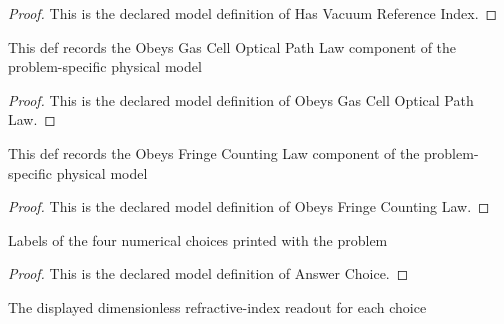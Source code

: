 \begin{proof}
  This is the declared model definition of Has Vacuum Reference Index.
\end{proof}
\begin{definition}
  \label{def:physics:phyx-mini-0152:phyxminiproblems-problemphyxmini0152-obeysgascellopticalpathlaw}
  This def records the Obeys Gas Cell Optical Path Law component of the problem-specific physical model
\end{definition}
\begin{proof}
  This is the declared model definition of Obeys Gas Cell Optical Path Law.
\end{proof}
\begin{definition}
  \label{def:physics:phyx-mini-0152:phyxminiproblems-problemphyxmini0152-obeysfringecountinglaw}
  This def records the Obeys Fringe Counting Law component of the problem-specific physical model
\end{definition}
\begin{proof}
  This is the declared model definition of Obeys Fringe Counting Law.
\end{proof}
\begin{definition}
  \label{def:physics:phyx-mini-0152:phyxminiproblems-problemphyxmini0152-answerchoice}
  Labels of the four numerical choices printed with the problem
\end{definition}
\begin{proof}
  This is the declared model definition of Answer Choice.
\end{proof}
\begin{definition}
  \label{def:physics:phyx-mini-0152:phyxminiproblems-problemphyxmini0152-answerrefractiveindex}
  The displayed dimensionless refractive-index readout for each choice
\end{definition}
